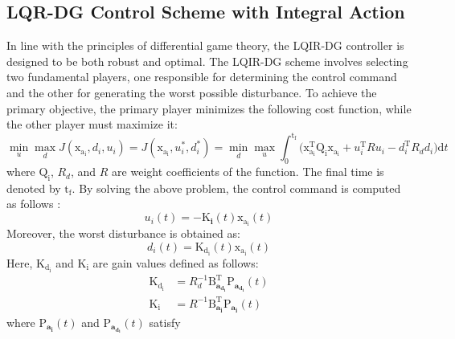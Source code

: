 \documentclass[preprint,12pt,authoryear]{elsarticle}
\begin{document}
\subsection{LQR-DG Control Scheme with Integral Action}
\noindent In line with the principles of differential game theory, the LQIR-DG controller is designed to be both robust and optimal.
The LQIR-DG scheme involves selecting two fundamental players, one responsible for determining the control command and the other for generating the worst possible disturbance. To achieve the primary objective, the primary player minimizes the following cost function, while the other player must maximize it:
\begin{equation}
    \min_{u} \max_{d} J(\boldsymbol{\mathrm{x_{a_i}}}, {d_i}, {u_i}) = J(\boldsymbol{\mathrm{x_{a_i}}}, {u^*_i}, {d^*_i})=\min_{d} \max_{u}
     \int_{0}^{\mathrm{t_f}}\biggl (\boldsymbol{\mathrm{x^\mathrm{T}_{a_i}}}  \boldsymbol{\mathrm{Q_i}} \boldsymbol{\mathrm{x_{a_i}}}+
    {{u^\mathrm{T}_i}}  {{R}} {{u_i}}-
    {{d^\mathrm{T}_{i}}} {{ R_{d} d_{i}}}
    \biggl )\mathrm{d}t
\end{equation}
where $\boldsymbol{\mathrm{Q_i}}$, ${{R_{d}}}$, and ${{R}}$ are weight coefficients of the function. The final time is denoted by $\mathrm{t_f}$.
By solving the above problem, the control command is computed as follows \citep{LQDG}:
\begin{equation}
	{{u_i}}(t) = -\boldsymbol{{\mathrm{K}}_{i}}(t) \boldsymbol{{\mathrm{x_{a_i}}}}(t)
\end{equation}
Moreover, the worst disturbance is obtained as:
\begin{equation}
	{{d_i}}(t) =\boldsymbol{{\mathrm{K_{d_i}}}}(t)\boldsymbol{{\mathrm{x_{a_i}}}}(t)
\end{equation}
Here, $\boldsymbol{{\mathrm{K_{d_i}}}}$ and $\boldsymbol{{\mathrm{K_i}}}$ are gain values defined as follows:
\begin{align}
	\boldsymbol{{\mathrm{K_{d_i}}}} &= {{{R}}^{-1}_{d}}\boldsymbol{{\mathrm{B}_{a_{d_i}}^\mathrm{T}}}\boldsymbol{{\mathrm{P}}_{a_{d_i}}}(t)\\
	\boldsymbol{{\mathrm{K_i}}} &= {{{R}}^{-1}}\boldsymbol{{\mathrm{B}_{a_i}^\mathrm{T}}}\boldsymbol{{\mathrm{P}}_{a_i}}(t)
\end{align}
where $\boldsymbol{{\mathrm{P}}_{a_i}}(t)$ and $\boldsymbol{{\mathrm{P}}_{a_{d_i}}}(t)$ satisfy
\end{document}
